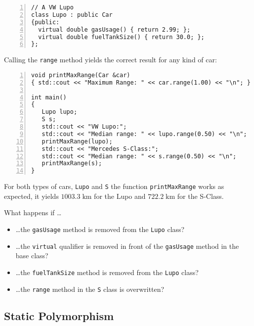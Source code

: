 \begin{example}
\begin{lstlisting}[basicstyle=\ttfamily\scriptsize,numbers=left,numberstyle=\tiny, numbersep=5pt]
// A VW Lupo
class Lupo : public Car
{public:
  virtual double gasUsage() { return 2.99; };
  virtual double fuelTankSize() { return 30.0; };
};
\end{lstlisting}

\noindent
Calling the \texttt{range} method yields the correct result for any
kind of car:
\begin{lstlisting}[basicstyle=\ttfamily\scriptsize,numbers=left,numberstyle=\tiny, numbersep=5pt]
void printMaxRange(Car &car)
{ std::cout << "Maximum Range: " << car.range(1.00) << "\n"; }

int main()
{
   Lupo lupo;
   S s;
   std::cout << "VW Lupo:";
   std::cout << "Median range: " << lupo.range(0.50) << "\n";
   printMaxRange(lupo);
   std::cout << "Mercedes S-Class:";
   std::cout << "Median range: " << s.range(0.50) << "\n";
   printMaxRange(s);
}
\end{lstlisting}

For both types of cars, \texttt{Lupo} and \texttt{S} the function
\texttt{printMaxRange} works as expected, it yields
$1003.3\;\mathrm{km}$ for the Lupo and $722.2\;\mathrm{km}$ for the
S-Class.
\end{example}

\begin{exc}
What happens if \dots 
\begin{itemize}
\item \dots the \texttt{gasUsage} method is removed from the \texttt{Lupo} class?
\item \dots the \texttt{virtual} qualifier is removed in front of the
  \texttt{gasUsage} method in the base class?
\item \dots the \texttt{fuelTankSize} method is removed from the \texttt{Lupo} class?
\item \dots the \texttt{range} method in the \texttt{S} class is
  overwritten?
\end{itemize}
\end{exc}

\subsection*{Static Polymorphism}

